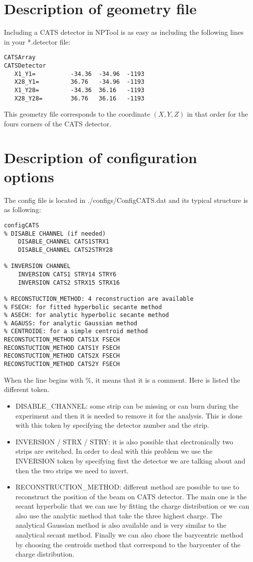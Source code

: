 \documentclass[a4paper,12pt]{article}
\begin{document}
\section{Description of geometry file}
Including a CATS detector in NPTool is as easy as including the following
lines in your *.detector file:
\begin{verbatim}
CATSArray
CATSDetector
   X1_Y1=          -34.36  -34.96  -1193
   X28_Y1=         36.76   -34.96  -1193
   X1_Y28=         -34.36  36.16   -1193
   X28_Y28=        36.76   36.16   -1193
\end{verbatim}
This geometry file corresponds to the coordinate $(X,Y,Z)$ in that order for the fours corners of the CATS detector.

\section{Description of configuration options}
The config file is located in ./configs/ConfigCATS.dat and its typical structure is as following:
\begin{verbatim}
configCATS
% DISABLE CHANNEL (if needed)
	DISABLE_CHANNEL CATS1STRX1
	DISABLE_CHANNEL CATS2STRY28

% INVERSION CHANNEL
	INVERSION CATS1 STRY14 STRY6
	INVERSION CATS2 STRX15 STRX16
	
% RECONSTUCTION_METHOD: 4 reconstruction are available
% FSECH: for fitted hyperbolic secante method 
% ASECH: for analytic hyperbolic secante method
% AGAUSS: for analytic Gaussian method
% CENTROIDE: for a simple centroid method
RECONSTUCTION_METHOD CATS1X FSECH
RECONSTUCTION_METHOD CATS1Y FSECH
RECONSTUCTION_METHOD CATS2X FSECH
RECONSTUCTION_METHOD CATS2Y FSECH
\end{verbatim}
When the line begins with \%, it means that it is a comment. Here is listed the different token.
\begin{itemize}
   \item DISABLE\_CHANNEL: some strip can be missing or can burn during the experiment and then it is needed to remove it for the analysis. This is done with this token by specifying the detector number and the strip.
   \item INVERSION / STRX / STRY: it is also possible that electronically two strips are switched. In order to deal with this problem we use the INVERSION token by specifying first the detector we are talking about and then the two strips we need to invert.
   \item RECONSTRUCTION\_METHOD: different method are possible to use to reconstruct the position of the beam on CATS detector. The main one is the secant hyperbolic that we can use by fitting the charge distribution or we can also use the analytic method that take the three highest charge. The analytical Gaussian method is also available and is very similar to the analytical secant method. Finally we can also chose the barycentric method by choosing the centroids method that correspond to the barycenter of the charge distribution.
\end{itemize}
\end{document}
